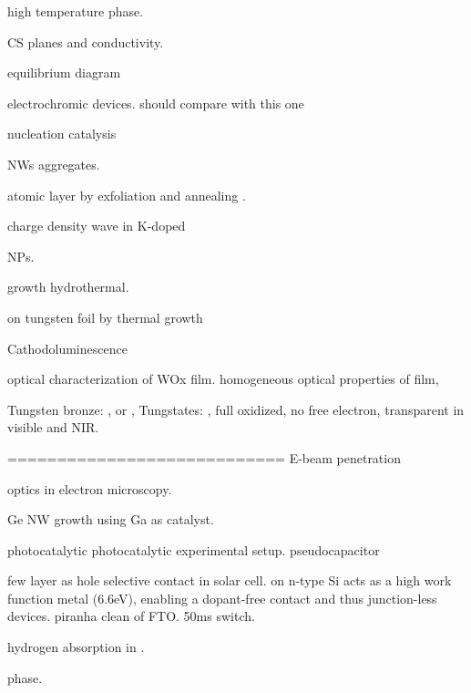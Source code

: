  \cite{Migas2010}

 high temperature phase. \cite{Vogt1999}


 CS planes and conductivity.\cite{Sahle1983}

 equilibrium diagram \cite{Wriedt1989}

 electrochromic devices.\cite{Liu2013d} should compare with this one \cite{Wang2008}

nucleation catalysis \cite{Turnbull1952}

 NWs aggregates. \cite{Kozan2008a}

 atomic layer by exfoliation and annealing . \cite{Kalantar-zadeh2010a}



charge density wave in K-doped  \cite{Raj2008}

 NPs. \cite{Frey2001}

 growth hydrothermal.\cite{Moshofsky2012}

 on tungsten foil by thermal growth\cite{VanHieu2012}

Cathodoluminescence \cite{Parish2007}

optical characterization of WOx film.\cite{Valyukh2010a}
homogeneous optical properties of  film,\cite{Valyukh2010a} 

Tungsten bronze: , or , 
Tungstates: , full oxidized, no free electron, transparent in visible and NIR. 

============================
E-beam penetration \cite{Kanaya2002}

optics in electron microscopy. \cite{GarciadeAbajo2010a}

Ge NW growth using Ga as catalyst. \cite{Chandrasekaran2006}

 photocatalytic \cite{Chithambararaj2013}
photocatalytic experimental setup.\cite{Hupka2006}
 pseudocapacitor  \cite{Brezesinski2010}

 few layer as hole selective contact in solar cell.\cite{Battaglia2014}
 on n-type Si acts as a high work function metal (6.6eV), enabling a dopant-free contact and thus junction-less devices.
piranha clean of FTO. 50ms switch.\cite{Scherer2012} 

hydrogen absorption in .\cite{Sha2009}

 phase. \cite{Bramnik2004}

